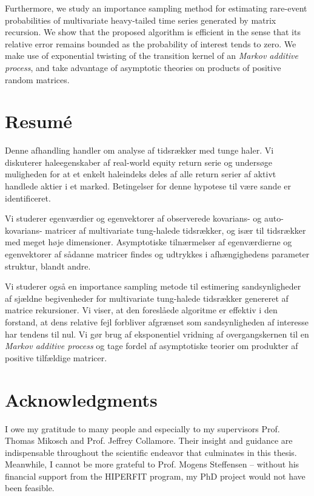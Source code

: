 Furthermore, we study an importance sampling method for estimating
rare-event probabilities of multivariate heavy-tailed time series
generated by matrix recursion. We show that the proposed algorithm is
efficient in the sense that its relative error remains bounded as the
probability of interest tends to zero. We make use of exponential
twisting of the transition kernel of an {\em Markov additive process},
and take advantage of asymptotic theories on products of positive
random matrices.

\section*{Resum{\'e}}
Denne afhandling handler om analyse af tidsrækker med tunge haler. Vi 
diskuterer haleegenskaber af real-world equity return serie og
undersøge muligheden for at et enkelt haleindeks deles af alle
return serier af aktivt handlede aktier i et marked. Betingelser for
denne hypotese til være sande er identificeret.

Vi studerer egenværdier og egenvektorer af observerede kovarians- og
auto-kovarians- matricer af multivariate tung-halede
tidsrækker, og især til tidsrækker med meget høje dimensioner.
Asymptotiske tilnærmelser af egenværdierne og egenvektorer af
sådanne matricer findes og udtrykkes i afhængighedens parameter
struktur, blandt andre.

Vi studerer også en importance sampling metode til estimering
sandsynligheder af sjældne begivenheder for multivariate tung-halede
tidsrækker genereret af matrice rekursioner. Vi viser, at den foreslåede
algoritme er effektiv i den forstand, at dens relative fejl forbliver
afgrænset som sandsynligheden af interesse har tendens til nul. Vi gør
brug af eksponentiel vridning af overgangskernen til en {\em Markov
additive process} og tage fordel af asymptotiske teorier om produkter
af positive tilfældige matricer.
\newpage
\section*{Acknowledgments}
I owe my gratitude to many people and especially to my supervisors
Prof. Thomas Mikosch and Prof. Jeffrey Collamore. Their insight and
guidance are indispensable throughout the scientific endeavor that
culminates in this thesis. Meanwhile, I cannot be more grateful to
Prof. Mogens Steffensen -- without his financial
support from the HIPERFIT program, my PhD project would not have
been feasible.

